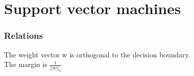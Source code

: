 \section{Support vector machines}
\subsubsection{Relations}
The weight vector w is orthogonal to the decision boundary.\\ The margin is
$\frac{1}{||w||_{2}}$\\